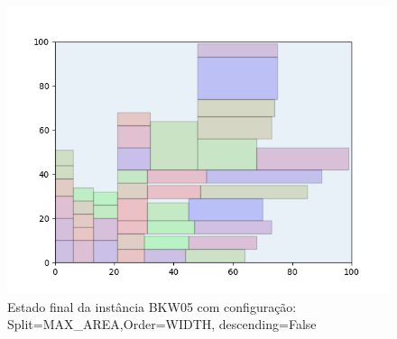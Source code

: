 \begin{figure}[H]
    \centering
    \caption[]{Estado final da instância BKW05 com configuração: Split=MAX_AREA,Order=WIDTH, descending=False}
    \label{fig:bkw05-max_area-width-false}
    \includegraphics[scale=0.5]{output/figures/bkw/bkw05/max_area/width/false/00}
\end{figure}